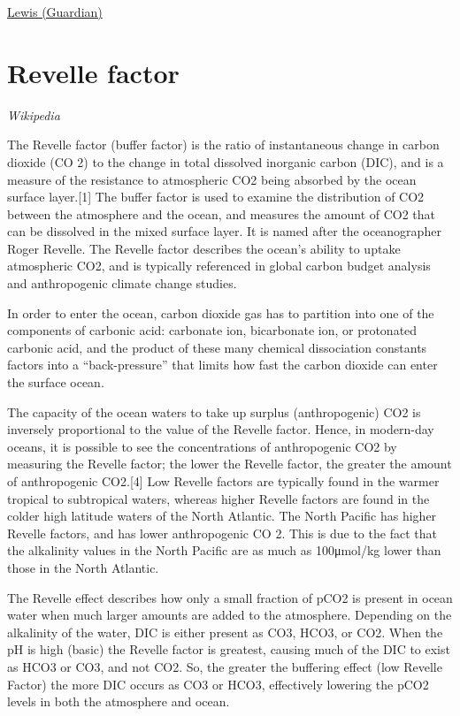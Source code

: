 \documentclass[
]{book}
\begin{document}
\href{https://www.theguardian.com/commentisfree/2021/mar/03/climate-crisis-carbon-accounting-tricks-big-finance}{Lewis (Guardian)}

\hypertarget{revelle-factor}{%
\section{Revelle factor}\label{revelle-factor}}

\emph{Wikipedia}

The Revelle factor (buffer factor) is the ratio of instantaneous change in carbon dioxide (CO
2) to the change in total dissolved inorganic carbon (DIC), and is a measure of the resistance to atmospheric CO2 being absorbed by the ocean surface layer.{[}1{]} The buffer factor is used to examine the distribution of CO2 between the atmosphere and the ocean, and measures the amount of CO2 that can be dissolved in the mixed surface layer. It is named after the oceanographer Roger Revelle. The Revelle factor describes the ocean's ability to uptake atmospheric CO2, and is typically referenced in global carbon budget analysis and anthropogenic climate change studies.

In order to enter the ocean, carbon dioxide gas has to partition into one of the components of carbonic acid: carbonate ion, bicarbonate ion, or protonated carbonic acid, and the product of these many chemical dissociation constants factors into a ``back-pressure'' that limits how fast the carbon dioxide can enter the surface ocean.

The capacity of the ocean waters to take up surplus (anthropogenic) CO2 is inversely proportional to the value of the Revelle factor. Hence, in modern-day oceans, it is possible to see the concentrations of anthropogenic CO2 by measuring the Revelle factor; the lower the Revelle factor, the greater the amount of anthropogenic CO2.{[}4{]} Low Revelle factors are typically found in the warmer tropical to subtropical waters, whereas higher Revelle factors are found in the colder high latitude waters of the North Atlantic. The North Pacific has higher Revelle factors, and has lower anthropogenic CO
2. This is due to the fact that the alkalinity values in the North Pacific are as much as 100μmol/kg lower than those in the North Atlantic.

The Revelle effect describes how only a small fraction of pCO2 is present in ocean water when much larger amounts are added to the atmosphere. Depending on the alkalinity of the water, DIC is either present as CO3, HCO3, or CO2. When the pH is high (basic) the Revelle factor is greatest, causing much of the DIC to exist as HCO3 or CO3, and not CO2. So, the greater the buffering effect (low Revelle Factor) the more DIC occurs as CO3 or HCO3, effectively lowering the pCO2 levels in both the atmosphere and ocean.
\end{document}
